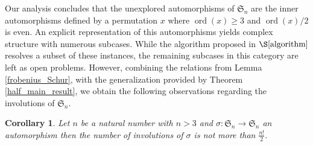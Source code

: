 \documentclass[oneside]{amsart}
\theoremstyle{plain}
\newtheorem{corollary}[theorem]{Corollary}%
\theoremstyle{definition}
\theoremstyle{remark}
\begin{document}
    Our analysis concludes that the unexplored automorphisms of $\mathfrak{S}_n$ are the inner automorphisms defined by a permutation $x$ where $\operatorname{ord}(x) \geq 3$ and $\operatorname{ord}(x)/2$ is even. An explicit representation of this automorphisms yields complex structure with numerous subcases. While the algorithm proposed in $\S \ref{algorithm}$ resolves a subset of these instances, the remaining subcases in this category are left as open problems. However, combining the relations from Lemma \ref{frobenius_Schur}, with the generalization provided by Theorem \ref{half_main_result}, we obtain the following observations regarding the involutions of $\mathfrak{S}_n$.
    \begin{corollary}
         Let $n$ be a natural number with $n > 3$ and $\sigma : \mathfrak{S}_n\to\mathfrak{S}_n$ an automorphism then the number of involutions of $\sigma$ is not more than $\frac{n!}{2}$.
    \end{corollary}
\end{document}

